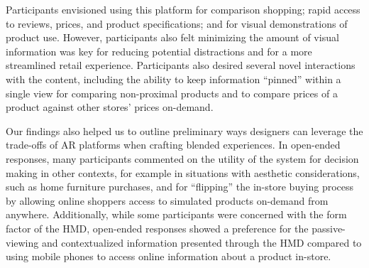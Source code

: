 Participants envisioned using this platform for comparison shopping; rapid access to reviews, prices, and product specifications; and for visual demonstrations of product use. However, participants also felt minimizing the amount of visual information was key for reducing potential distractions and for a more streamlined retail experience. 
Participants also desired several novel interactions with the content, including the ability to keep information ``pinned'' within a single view for comparing non-proximal products and to compare prices of a product against other stores' prices on-demand. 

Our findings also helped us to outline preliminary ways designers can leverage the trade-offs of AR platforms when crafting blended experiences. In open-ended responses, many participants commented on the utility of the system for decision making in other contexts, for example in situations with aesthetic considerations, such as home furniture purchases, and for ``flipping'' the in-store buying process by allowing online shoppers access to simulated products on-demand from anywhere. Additionally, while some participants were concerned with the form factor of the HMD, open-ended responses showed a preference for the passive-viewing and contextualized information presented through the HMD compared to using mobile phones to access online information about a product in-store. 


